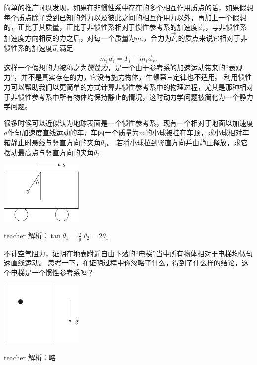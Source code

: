 简单的推广可以发现，如果在非惯性系中存在的多个相互作用质点的话，如果假想每个质点除了受到已知的外力以及彼此之间的相互作用力以外，再加上一个假想的，正比于其质量，正比于非惯性系相对于惯性参考系的加速度$\vec{a}_r$，与非惯性系加速度方向相反的力之后，对每一个质量为$m_i$，合力为$\vec{F}_i$的质点来说它相对于非惯性系的加速度$\vec{a}_i$满足
\begin{equation}\label{key}
m_i\vec{a}_i = \vec{F}_i-m_i\vec{a}_r.
\end{equation}
这样一个假想的力被称之为\emph{惯性力}，是一个由于参考系的加速运动带来的“表观力”，并不是真实存在的力，它没有施力物体，牛顿第三定律也不适用。
利用惯性力可以帮助我们以更简单的方式计算非惯性参考系中的物理过程，尤其是那种相对于非惯性参考系中所有物体均保持静止的情况，这时动力学问题被简化为一个静力学问题。

\begin{example}
  很多时候可以近似认为地球表面是一个惯性参考系，现有一个相对于地面以加速度$a$作匀加速度直线运动的车，车内一个质量为$m$的小球被挂在车顶，求小球相对车箱静止时悬线与竖直方向的夹角$\theta_1$。
  若将小球拉到竖直方向并由静止释放，求它摆动最高点与竖直方向的夹角$\theta_2$
  	\begin{flushright}
  		\includegraphics[width = 0.3\textwidth]{images/newton-15.pdf} 
  	\end{flushright}
	\begin{taggedblock}{teacher}
		\noindent
		解析：$\tan\theta_1=\frac{a}{g}$
		\newline
		$\theta_2=2\theta_1$
	\end{taggedblock}
\end{example}


\begin{example}
	不计空气阻力，证明在地表附近自由下落的“电梯”当中所有物体相对于电梯均做匀速直线运动。
	思考一下，在证明过程中你忽略了什么，得到了什么样的结论，这个电梯是一个惯性参考系吗？
		\begin{flushright}
			\includegraphics[width = 0.3\textwidth]{images/newton-16.pdf} 
		\end{flushright}
	\begin{taggedblock}{teacher}
	\noindent	
		解析：略
	\end{taggedblock}
\end{example}


